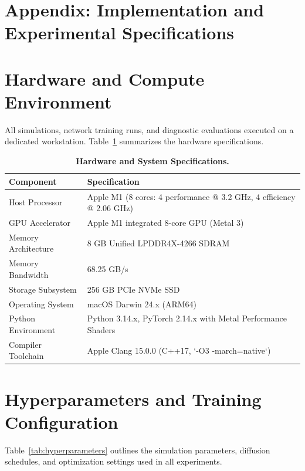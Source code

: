 \documentclass[11pt,a4paper]{article}
\begin{document}



\clearpage
\appendix
\section*{Appendix: Implementation and Experimental Specifications}
\label{sec:appendix}

\section{Hardware and Compute Environment}
All simulations, network training runs, and diagnostic evaluations executed on a dedicated workstation. Table~\ref{tab:hardware_specs} summarizes the hardware specifications.

\begin{table}[H]
\centering
\small
\caption{\textbf{Hardware and System Specifications.}}
\label{tab:hardware_specs}
\begin{tabular}{ll}
\toprule
\textbf{Component} & \textbf{Specification} \\
\midrule
Host Processor              & Apple M1 (8 cores: 4 performance @ 3.2 GHz, 4 efficiency @ 2.06 GHz) \\
GPU Accelerator             & Apple M1 integrated 8-core GPU (Metal 3) \\
Memory Architecture         & 8 GB Unified LPDDR4X-4266 SDRAM \\
Memory Bandwidth            & 68.25 GB/s \\
Storage Subsystem           & 256 GB PCIe NVMe SSD \\
Operating System            & macOS Darwin 24.x (ARM64) \\
Python Environment          & Python 3.14.x, PyTorch 2.14.x with Metal Performance Shaders \\
Compiler Toolchain          & Apple Clang 15.0.0 (C++17, `-O3 -march=native`) \\
\bottomrule
\end{tabular}
\end{table}

\section{Hyperparameters and Training Configuration}
Table~\ref{tab:hyperparameters} outlines the simulation parameters, diffusion schedules, and optimization settings used in all experiments.
\end{document}
